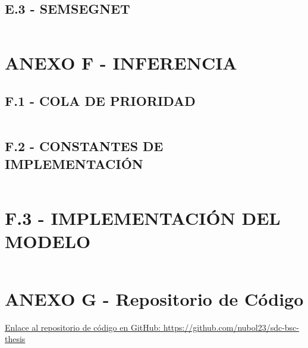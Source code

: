 \subsection*{E.3 - SEMSEGNET}
	\inputminted[frame=lines,
	baselinestretch=1,
	fontsize=\footnotesize,
	autogobble]{python}{codigos/apendices/semseg_train.py}
\section*{ANEXO F - INFERENCIA}
\subsection*{F.1 - COLA DE PRIORIDAD}
	\inputminted[frame=lines,
	baselinestretch=1,
	fontsize=\footnotesize,
	autogobble]{python}{codigos/apendices/priority_queue.py}
\subsection*{F.2 - CONSTANTES DE IMPLEMENTACIÓN}
	\inputminted[frame=lines,
	baselinestretch=1,
	fontsize=\footnotesize,
	autogobble]{python}{codigos/apendice_d/constants.py}
\section*{F.3 - IMPLEMENTACIÓN DEL MODELO}
	\inputminted[frame=lines,
	baselinestretch=1,
	fontsize=\footnotesize,
	autogobble]{python}{codigos/apendice_e/inferencia.py}
	
\section*{ANEXO G - Repositorio de Código}
	\href{https://github.com/nubol23/sdc-bsc-thesis}{Enlace al repositorio de código en GitHub: https://github.com/nubol23/sdc-bsc-thesis}

